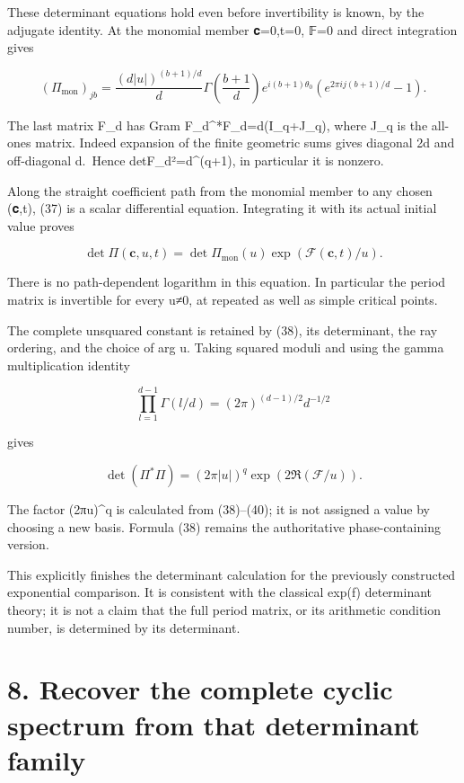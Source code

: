 \documentclass[
  11pt,
]{article}
\begin{document}
These determinant equations hold even before invertibility is known, by
the adjugate identity. At the monomial member 𝐜=0,t=0, 𝔽=0 and direct
integration gives

\[
(\Pi_{\mathrm{mon}})_{jb}
 =\frac{(d|u|)^{(b+1)/d}}d
 \Gamma\!\left(\frac{b+1}d\right)
 e^{i(b+1)\theta_0}
 (e^{2\pi i j(b+1)/d}-1).
\tag{38}
\]

The last matrix F\_d has Gram F\_d\^{}*F\_d=d(I\_q+J\_q), where J\_q is
the all-ones matrix. Indeed expansion of the finite geometric sums gives
diagonal 2d and off-diagonal d.~Hence
\textbar detF\_d\textbar²=d\^{}(q+1), in particular it is nonzero.

Along the straight coefficient path from the monomial member to any
chosen (𝐜,t), (37) is a scalar differential equation. Integrating it
with its actual initial value proves

\[
\boxed{
\det\Pi(\mathbf c,u,t)
 =\det\Pi_{\mathrm{mon}}(u)\exp(\mathcal F(\mathbf c,t)/u).
}
\tag{39}
\]

There is no path-dependent logarithm in this equation. In particular the
period matrix is invertible for every u≠0, at repeated as well as simple
critical points.

The complete unsquared constant is retained by (38), its determinant,
the ray ordering, and the choice of arg u. Taking squared moduli and
using the gamma multiplication identity

\[
\prod_{l=1}^{d-1}\Gamma(l/d)=(2\pi)^{(d-1)/2}d^{-1/2}
\tag{40}
\]

gives

\[
\boxed{\det(\Pi^*\Pi)
 =(2\pi|u|)^q\exp(2\Re(\mathcal F/u)).}
\tag{41}
\]

The factor (2π\textbar u\textbar)\^{}q is calculated from (38)--(40); it
is not assigned a value by choosing a new basis. Formula (38) remains
the authoritative phase-containing version.

This explicitly finishes the determinant calculation for the previously
constructed exponential comparison. It is consistent with the classical
exp(f) determinant theory; it is not a claim that the full period
matrix, or its arithmetic condition number, is determined by its
determinant.

\section{8. Recover the complete cyclic spectrum from that determinant
family}\label{recover-the-complete-cyclic-spectrum-from-that-determinant-family}
\end{document}
